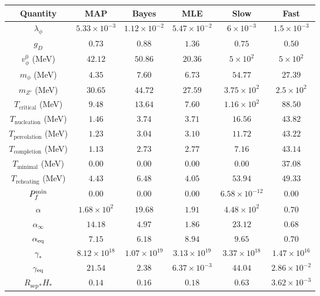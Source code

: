 \begin{tabular}{|c|c|c|c|c|c|}
\hline
Quantity & MAP & Bayes & MLE & Slow & Fast \\
\hline
$\lambda_\phi$ & $5.33 \times 10^{-3}$ & $1.12 \times 10^{-2}$ & $5.47 \times 10^{-2}$ & $6 \times 10^{-3}$ & $1.5 \times 10^{-3}$ \\
\hline
$g_D$ & $0.73$ & $0.88$ & $1.36$ & $0.75$ & $0.50$ \\
\hline
$v_\phi^0$ (MeV) & $42.12$ & $50.86$ & $20.36$ & $5 \times 10^{2}$ & $5 \times 10^{2}$ \\
\hline
$m_{\phi}$ (MeV) & $4.35$ & $7.60$ & $6.73$ & $54.77$ & $27.39$ \\
\hline
$m_{Z'}$ (MeV) & $30.65$ & $44.72$ & $27.59$ & $3.75 \times 10^{2}$ & $2.5 \times 10^{2}$ \\
\hline
$T_\textrm{critical}$ (MeV) & $9.48$ & $13.64$ & $7.60$ & $1.16 \times 10^{2}$ & $88.50$ \\
\hline
$T_\textrm{nucleation}$ (MeV) & $1.46$ & $3.74$ & $3.71$ & $16.56$ & $43.82$ \\
\hline
$T_\textrm{percolation}$ (MeV) & $1.23$ & $3.04$ & $3.10$ & $11.72$ & $43.22$ \\
\hline
$T_\textrm{completion}$ (MeV) & $1.13$ & $2.73$ & $2.77$ & $7.16$ & $43.14$ \\
\hline
$T_\textrm{minimal}$ (MeV) & $0.00$ & $0.00$ & $0.00$ & $0.00$ & $37.08$ \\
\hline
$T_\textrm{reheating}$ (MeV) & $4.43$ & $6.48$ & $4.05$ & $53.94$ & $49.33$ \\
\hline
$P_f^{\rm min}$ & $0.00$ & $0.00$ & $0.00$ & $6.58 \times 10^{-12}$ & $0.00$ \\
\hline
$\alpha$ & $1.68 \times 10^{2}$ & $19.68$ & $1.91$ & $4.48 \times 10^{2}$ & $0.70$ \\
\hline
$\alpha_\infty$ & $14.18$ & $4.97$ & $1.86$ & $23.12$ & $0.68$ \\
\hline
$\alpha_{\rm eq}$ & $7.15$ & $6.18$ & $8.94$ & $9.65$ & $0.70$ \\
\hline
$\gamma_*$ & $8.12 \times 10^{18}$ & $1.07 \times 10^{19}$ & $3.13 \times 10^{19}$ & $3.37 \times 10^{18}$ & $1.47 \times 10^{16}$ \\
\hline
$\gamma_{\rm eq}$ & $21.54$ & $2.38$ & $6.37 \times 10^{-3}$ & $44.04$ & $2.86 \times 10^{-2}$ \\
\hline
$R_\textrm{sep}{}_* H_*$ & $0.14$ & $0.16$ & $0.18$ & $0.63$ & $3.62 \times 10^{-3}$ \\
\hline
\end{tabular}
